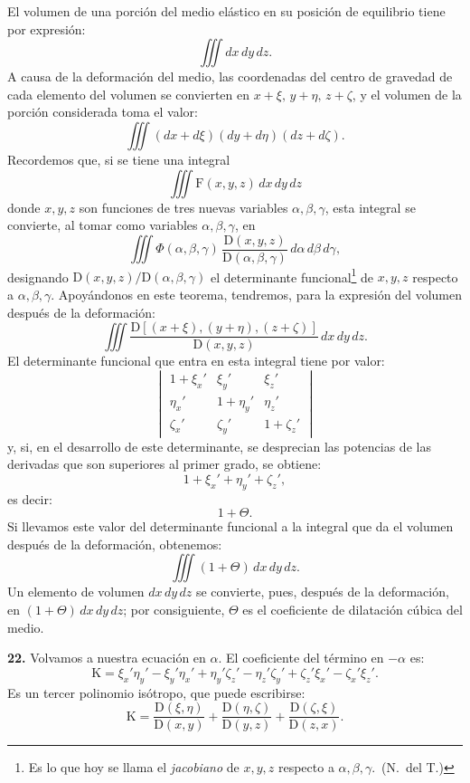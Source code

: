 El volumen de una porción del medio elástico en su posición de equilibrio
tiene por expresión:
\[
\iiint dx\,dy\,dz.
\]
A causa de la deformación del medio, las coordenadas del centro de
gravedad de cada elemento del volumen se convierten en $x+\xi,\,y+\eta,
\,z+\zeta$, y el volumen de la porción considerada toma el valor:
\[
\iiint (dx+d\xi)(dy+d\eta)(dz+d\zeta).
\]
Recordemos que, si se tiene una integral
\[
\iiint \mathrm{F}(x,y,z)\,dx\,dy\,dz
\]
donde $x,y,z$ son funciones de tres nuevas variables $\alpha,\beta,\gamma$,
esta integral se convierte, al tomar como variables $\alpha,\beta,\gamma$,
en
\[
\iiint \Phi(\alpha,\beta,\gamma)\,\frac{\mathrm{D}(x,y,z)}{\mathrm{D}(\alpha,\beta,\gamma)}\,d\alpha\,d\beta\,d\gamma,
\]
designando $\mathrm{D}(x,y,z)/\mathrm{D}(\alpha,\beta,\gamma)$ el
determinante funcional\footnote{Es lo que hoy se llama el \emph{jacobiano}
de $x,y,z$ respecto a $\alpha,\beta,\gamma$.~(N.~del T.)} de $x,y,z$ respecto a
$\alpha,\beta,\gamma$. Apoyándonos en este teorema, tendremos,
para la expresión del volumen después de la deformación:
\[
\iiint \frac{\mathrm{D}[(x+\xi),(y+\eta),(z+\zeta)]}{\mathrm{D}(x,y,z)}\,dx\,dy\,dz.
\]
El determinante funcional que entra en esta integral tiene por valor:
\[
\begin{vmatrix}
1+\xi_x' & \xi_y' & \xi_z'\\
\eta_x' & 1+\eta_y' & \eta_z'\\
\zeta_x' & \zeta_y' & 1+\zeta_z'
\end{vmatrix}
\]
y, si, en el desarrollo de este determinante, se desprecian las potencias
de las derivadas que son superiores al primer grado, se obtiene:
\[
1+\xi_x'+\eta_y'+\zeta_z',
\]
es decir:
\[
1+\Theta.
\]
Si llevamos este valor del determinante funcional a la integral que da el
volumen después de la deformación, obtenemos:
\[
\iiint (1+\Theta)\,dx\,dy\,dz.
\]
Un elemento de volumen $dx\,dy\,dz$ se convierte, pues, después de la
deformación, en $(1+\Theta)\,dx\,dy\,dz$; por consiguiente, $\Theta$ es el
coeficiente de dilatación cúbica del medio.

\noindent\textbf{22.} Volvamos a nuestra ecuación en $\alpha$. El
coeficiente del término en $-\alpha$ es:
\begin{equation}
\mathrm{K}=\xi_x'\eta_y'-\xi_y'\eta_x'+\eta_y'\zeta_z'-\eta_z'\zeta_y'+\zeta_z'\xi_x'-\zeta_x'\xi_z'.
\tag{26}
\end{equation}
Es un tercer polinomio isótropo, que puede escribirse:
\[
\mathrm{K}=\frac{\mathrm{D}(\xi,\eta)}{\mathrm{D}(x,y)}+\frac{\mathrm{D}(\eta,\zeta)}{\mathrm{D}(y,z)}+\frac{\mathrm{D}(\zeta,\xi)}{\mathrm{D}(z,x)}.
\]

